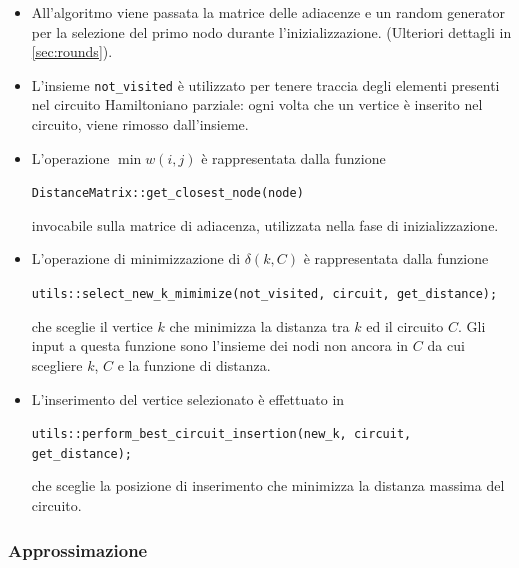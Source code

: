 \begin{itemize}
    \item All'algoritmo viene passata la matrice delle adiacenze e un
      random generator per la selezione del primo nodo durante
      l'inizializzazione. (Ulteriori dettagli in
      \ref{sec:rounds}).\\

    \item L'insieme \texttt{not_visited} è utilizzato per
      tenere traccia degli elementi presenti nel circuito Hamiltoniano
      parziale: ogni volta che un vertice è inserito nel circuito,
      viene rimosso dall'insieme.\\

    \item L'operazione $\min w(i, j)$ è rappresentata dalla funzione
    \begin{center}
        \texttt{DistanceMatrix::get_closest_node(node)}
    \end{center}
    invocabile sulla matrice di adiacenza, utilizzata nella fase di
    inizializzazione.\\

    \item L'operazione di minimizzazione di $\delta(k, C)$ è
      rappresentata dalla funzione
    \begin{center}
        \texttt{utils::select_new_k_mimimize(not_visited, circuit, get_distance);}
    \end{center}
    che sceglie il vertice $k$ che minimizza la distanza tra $k$
    ed il circuito $C$. Gli input a questa funzione sono l'insieme
    dei nodi non ancora in $C$ da cui scegliere $k$, $C$ e la
    funzione di distanza.\\

    \item L'inserimento del vertice selezionato è effettuato in
    \begin{center}
        \texttt{utils::perform_best_circuit_insertion(new_k, circuit, get_distance);}
    \end{center}
    che sceglie la posizione di inserimento che minimizza la distanza
    massima del circuito.\\
\end{itemize}

\subsubsection{Approssimazione}

